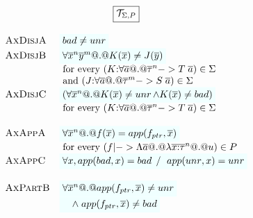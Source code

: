 \documentclass[preprint,nocopyrightspace]{sigplanconf}
\begin{document}
\begin{figure}\small
\[\begin{array}{c}
\ruleform{\Th{\Sigma}{P}} \\ \\ 
\begin{array}{lll} 
 \textsc{AxDisjA} & \formula{\bad \neq \unr}  \\ 
 \textsc{AxDisjB} & \formula{\forall \oln{x}{n}\oln{y}{m} @.@ K(\ol{x}) \neq J(\ol{y})} \\ 
                  & \text{ for every } (K{:}\forall\as @.@ \oln{\tau}{n} -> T\;\as) \in \Sigma \\ 
                  & \text{ and } (J{:}\forall\as @.@ \oln{\tau}{m} -> S\;\as) \in \Sigma \\
 \textsc{AxDisjC} & \formula{(\forall \oln{x}{n} @.@ K(\ol{x}) \neq \unr \land K(\ol{x}) \neq \bad)} \\ 
                  & \text{ for every } (K{:}\forall\as @.@ \oln{\tau}{n} -> T\;\as) \in \Sigma \\ \\
 \textsc{AxAppA}  & \formula{\forall \oln{x}{n} @.@ f(\ol{x}) = app(f_{ptr},\xs)} \\
                  & \text{ for every } (f |-> \Lambda\as @.@ \lambda\oln{x{:}\tau}{n} @.@ u) \in P \\
 \textsc{AxAppC}  & \formula{\forall x, app(\bad,x) = \bad \; /\ \; app(\unr,x) = \unr}    \\ \\
 \textsc{AxPartB} & \formula{\forall \oln{x}{n} @.@ app(f_{ptr},\xs) \neq \unr} \\
                  & \formula{\quad\land\; app(f_{ptr},\xs) \neq \bad} \\

\end{array}
\end{array}\]
\end{figure}
\end{document}
